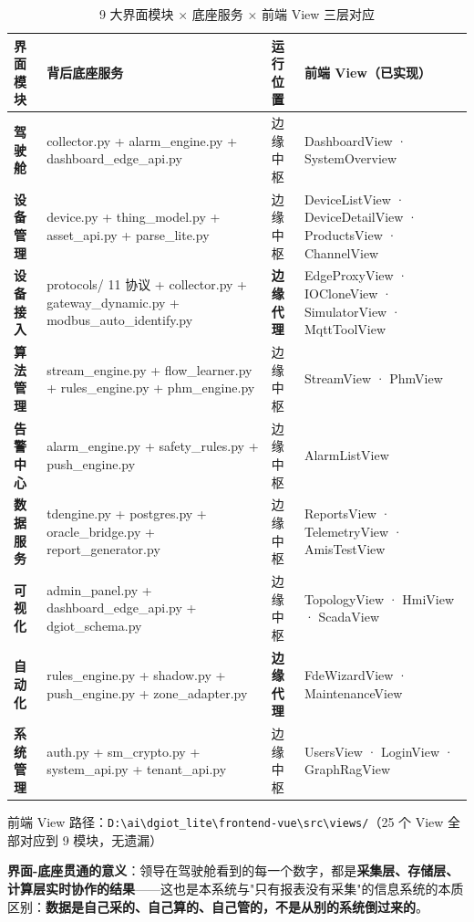 \documentclass[11pt,a4paper]{ctexart}
\begin{document}
\begin{table}[H]\centering
\caption{9 大界面模块 × 底座服务 × 前端 View 三层对应}
{\small
\begin{tabular}{p{1.8cm} p{4.3cm} p{3.8cm} p{3.2cm}}
\toprule
\textbf{界面模块} & \textbf{背后底座服务} & \textbf{运行位置} & \textbf{前端 View（已实现）} \\
\midrule
\textbf{驾驶舱} & collector.py + alarm\_engine.py + dashboard\_edge\_api.py & 边缘中枢 & DashboardView · SystemOverview \\
\textbf{设备管理} & device.py + thing\_model.py + asset\_api.py + parse\_lite.py & 边缘中枢 & DeviceListView · DeviceDetailView · ProductsView · ChannelView \\
\textbf{设备接入} & protocols/ 11 协议 + collector.py + gateway\_dynamic.py + modbus\_auto\_identify.py & \textbf{边缘代理} & EdgeProxyView · IOCloneView · SimulatorView · MqttToolView \\
\textbf{算法管理} & stream\_engine.py + flow\_learner.py + rules\_engine.py + phm\_engine.py & 边缘中枢 & StreamView · PhmView \\
\textbf{告警中心} & alarm\_engine.py + safety\_rules.py + push\_engine.py & 边缘中枢 & AlarmListView \\
\textbf{数据服务} & tdengine.py + postgres.py + oracle\_bridge.py + report\_generator.py & 边缘中枢 & ReportsView · TelemetryView · AmisTestView \\
\textbf{可视化} & admin\_panel.py + dashboard\_edge\_api.py + dgiot\_schema.py & 边缘中枢 & TopologyView · HmiView · ScadaView \\
\textbf{自动化} & rules\_engine.py + shadow.py + push\_engine.py + zone\_adapter.py & \textbf{边缘代理} & FdeWizardView · MaintenanceView \\
\textbf{系统管理} & auth.py + sm\_crypto.py + system\_api.py + tenant\_api.py & 边缘中枢 & UsersView · LoginView · GraphRagView \\
\bottomrule
\end{tabular}
}
\end{table}

{\footnotesize 前端 View 路径：\texttt{D:\textbackslash ai\textbackslash dgiot\_lite\textbackslash frontend-vue\textbackslash src\textbackslash views/}（25 个 View 全部对应到 9 模块，无遗漏）}

\textbf{界面-底座贯通的意义}：领导在驾驶舱看到的每一个数字，都是\textbf{采集层、存储层、计算层实时协作的结果}——这也是本系统与"只有报表没有采集"的信息系统的本质区别：\textbf{数据是自己采的、自己算的、自己管的，不是从别的系统倒过来的}。
\end{document}

